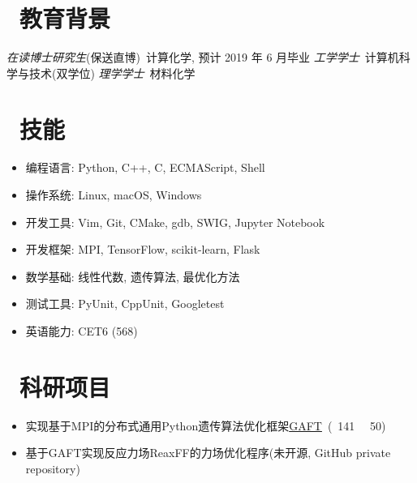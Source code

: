 \documentclass{resume}
\begin{document}


 
\section{\faGraduationCap\  教育背景}
\textit{在读博士研究生}(保送直博)\ 计算化学, 预计 2019 年 6 月毕业
\textit{工学学士}\ 计算机科学与技术(双学位)
\textit{理学学士}\ 材料化学

\section{\faCogs\ 技能}
\begin{itemize}[parsep=0.5ex]
  \item 编程语言: Python, C++, C, ECMAScript, Shell
  \item 操作系统: Linux, macOS, Windows
  \item 开发工具: Vim, Git, CMake, gdb, SWIG, Jupyter Notebook
  \item 开发框架: MPI, TensorFlow, scikit-learn, Flask
  \item 数学基础: 线性代数, 遗传算法, 最优化方法
  \item 测试工具: PyUnit, CppUnit, Googletest
  \item 英语能力: CET6 (568)
\end{itemize}

\section{\faUsers\ 科研项目}

\begin{onehalfspacing}
\begin{itemize}
    \item 实现基于MPI的分布式通用Python遗传算法优化框架\faLink \href{https://github.com/PytLab/gaft}{GAFT}\ (\faStar\ 141 \ \faCodeFork\ 50)
    \item 基于GAFT实现反应力场ReaxFF的力场优化程序(未开源, GitHub private repository)
\end{itemize}
\end{onehalfspacing}
\end{document}
